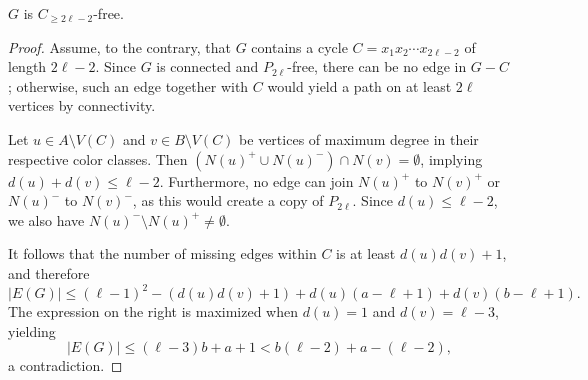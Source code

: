\documentclass[10pt,a4paper]{amsart}
\begin{document}
\begin{claim}\label{claim:2l-2-free}
$G$ is $C_{\ge 2\ell-2}$-free.
\end{claim} 

\begin{proof}
Assume, to the contrary, that $G$ contains a cycle $C = x_1x_2\cdots x_{2\ell-2}$ of length $2\ell - 2$.  
Since $G$ is connected and $P_{2\ell}$-free, there can be no edge in $G - C$; otherwise, such an edge together with $C$ would yield a path on at least $2\ell$ vertices by connectivity.  

Let $u \in A \setminus V(C)$ and $v \in B \setminus V(C)$ be vertices of maximum degree in their respective color classes.  
Then $(N(u)^+ \cup N(u)^-) \cap N(v) = \emptyset$, implying $d(u) + d(v) \le \ell - 2$.  
Furthermore, no edge can join $N(u)^+$ to $N(v)^+$ or $N(u)^-$ to $N(v)^-$, as this would create a copy of $P_{2\ell}$.  
Since $d(u) \le \ell - 2$, we also have $N(u)^- \setminus N(u)^+ \neq \emptyset$.  

It follows that the number of missing edges within $C$ is at least $d(u)d(v) + 1$, and therefore
\[
|E(G)| \le (\ell - 1)^2 - (d(u)d(v) + 1) + d(u)(a - \ell + 1) + d(v)(b - \ell + 1).
\]
The expression on the right is maximized when $d(u) = 1$ and $d(v) = \ell - 3$, yielding
\[
|E(G)| \le (\ell - 3)b + a + 1 < b(\ell - 2) + a - (\ell - 2),
\]
a contradiction.
\end{proof}
\end{document}
